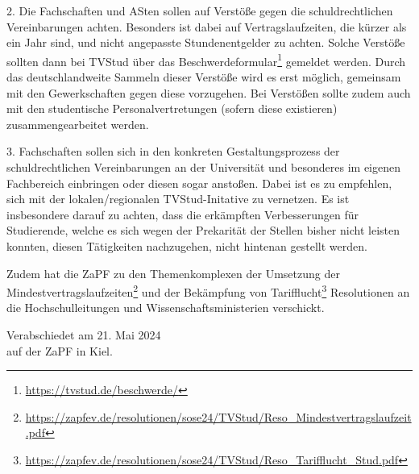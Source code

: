 \documentclass[DIV=calc]{scrartcl}
\begin{document}
2. Die Fachschaften und ASten sollen auf Verstöße gegen die schuldrechtlichen Vereinbarungen achten. Besonders ist dabei auf Vertragslaufzeiten, die kürzer als ein Jahr sind, und nicht angepasste Stundenentgelder zu achten. Solche Verstöße sollten dann bei TVStud über das Beschwerdeformular\footnote{\url{https://tvstud.de/beschwerde/}} gemeldet werden. Durch das deutschlandweite Sammeln dieser Verstöße wird es erst möglich, gemeinsam mit den Gewerkschaften gegen diese vorzugehen. Bei Verstößen sollte zudem auch mit den studentische Personalvertretungen (sofern diese existieren) zusammengearbeitet werden.

3. Fachschaften sollen sich in den konkreten Gestaltungsprozess der schuldrechtlichen Vereinbarungen an der Universität und besonderes im eigenen Fachbereich einbringen oder diesen sogar anstoßen. Dabei ist es zu empfehlen, sich mit der lokalen/regionalen TVStud-Initative zu vernetzen. Es ist insbesondere darauf zu achten, dass die erkämpften Verbesserungen für Studierende, welche es sich wegen der Prekarität der Stellen bisher nicht leisten konnten, diesen Tätigkeiten nachzugehen, nicht hintenan gestellt werden.
  
Zudem hat die ZaPF zu den Themenkomplexen der Umsetzung der Mindestvertragslaufzeiten\footnote{\url{https://zapfev.de/resolutionen/sose24/TVStud/Reso_Mindestvertragslaufzeit.pdf}} und der Bekämpfung von Tarifflucht\footnote{\url{https://zapfev.de/resolutionen/sose24/TVStud/Reso_Tarifflucht_Stud.pdf}} Resolutionen an die Hochschulleitungen und Wissenschaftsministerien verschickt.


%
\vfill
\begin{flushright}
	Verabschiedet am 21. Mai 2024 \\
	auf der ZaPF in Kiel.
\end{flushright}
\end{document}
